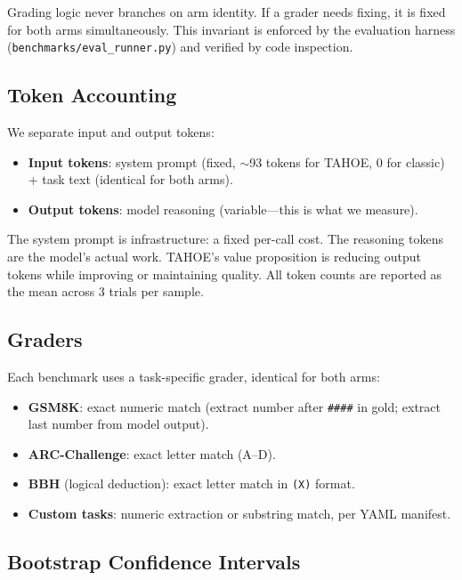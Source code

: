 \documentclass[11pt,a4paper]{article}
\begin{document}
Grading logic never branches on arm identity.
If a grader needs fixing, it is fixed for both arms simultaneously.
This invariant is enforced by the evaluation harness (\texttt{benchmarks/eval\_runner.py}) and verified by code inspection.

\subsection{Token Accounting}
\label{subsec:token-accounting}

We separate input and output tokens:

\begin{itemize}[nosep,leftmargin=*]
    \item \textbf{Input tokens}: system prompt (fixed, $\sim$93 tokens for TAHOE, 0 for classic) + task text (identical for both arms).
    \item \textbf{Output tokens}: model reasoning (variable---this is what we measure).
\end{itemize}

The system prompt is infrastructure: a fixed per-call cost.
The reasoning tokens are the model's actual work.
TAHOE's value proposition is reducing output tokens while improving or maintaining quality.
All token counts are reported as the mean across 3 trials per sample.

\subsection{Graders}
\label{subsec:graders}

Each benchmark uses a task-specific grader, identical for both arms:

\begin{itemize}[nosep,leftmargin=*]
    \item \textbf{GSM8K}: exact numeric match (extract number after \texttt{\#\#\#\#} in gold; extract last number from model output).
    \item \textbf{ARC-Challenge}: exact letter match (A--D).
    \item \textbf{BBH} (logical deduction): exact letter match in \texttt{(X)} format.
    \item \textbf{Custom tasks}: numeric extraction or substring match, per YAML manifest.
\end{itemize}

\subsection{Bootstrap Confidence Intervals}
\label{subsec:bootstrap}
\end{document}
